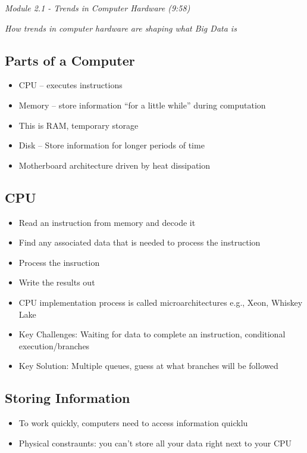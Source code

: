 \documentclass[
]{book}
\providecommand{\tightlist}{%
  \setlength{\itemsep}{0pt}\setlength{\parskip}{0pt}}
\begin{document}
\emph{Module 2.1 - Trends in Computer Hardware (9:58)}

\emph{How trends in computer hardware are shaping what Big Data is}

\subsection{Parts of a Computer}\label{parts-of-a-computer}

\begin{itemize}
\tightlist
\item
  CPU -- executes instructions
\item
  Memory -- store information ``for a little while'' during computation
\item
  This is RAM, temporary storage
\item
  Disk -- Store information for longer periods of time
\item
  Motherboard architecture driven by heat dissipation
\end{itemize}

\subsection{CPU}\label{cpu}

\begin{itemize}
\tightlist
\item
  Read an instruction from memory and decode it
\item
  Find any associated data that is needed to process the instruction
\item
  Process the insruction
\item
  Write the results out
\item
  CPU implementation process is called microarchitectures e.g., Xeon, Whiskey Lake
\item
  Key Challenges: Waiting for data to complete an instruction, conditional execution/branches
\item
  Key Solution: Multiple queues, guess at what branches will be followed
\end{itemize}

\subsection{Storing Information}\label{storing-information}

\begin{itemize}
\tightlist
\item
  To work quickly, computers need to access information quicklu
\item
  Physical constraunts: you can't store all your data right next to your CPU
\end{itemize}
\end{document}

